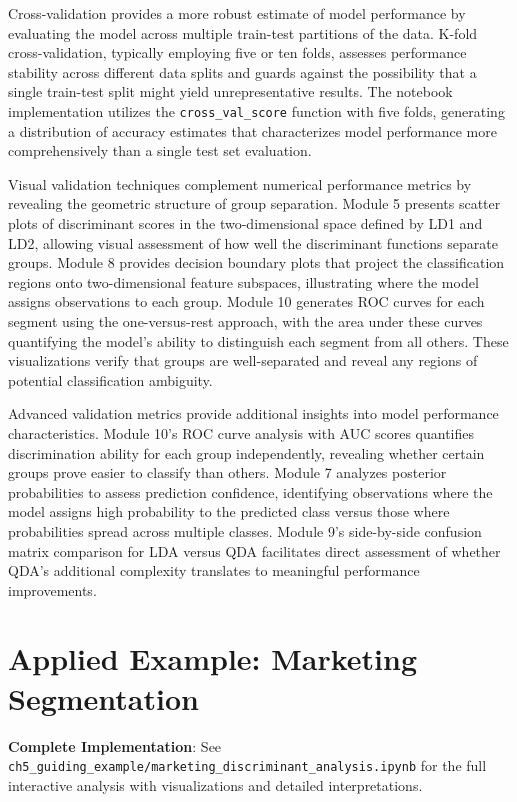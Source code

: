 \documentclass[
]{article}
\begin{document}
Cross-validation provides a more robust estimate of model performance by
evaluating the model across multiple train-test partitions of the data.
K-fold cross-validation, typically employing five or ten folds, assesses
performance stability across different data splits and guards against
the possibility that a single train-test split might yield
unrepresentative results. The notebook implementation utilizes the
\texttt{cross\_val\_score} function with five folds, generating a
distribution of accuracy estimates that characterizes model performance
more comprehensively than a single test set evaluation.

Visual validation techniques complement numerical performance metrics by
revealing the geometric structure of group separation. Module 5 presents
scatter plots of discriminant scores in the two-dimensional space
defined by LD1 and LD2, allowing visual assessment of how well the
discriminant functions separate groups. Module 8 provides decision
boundary plots that project the classification regions onto
two-dimensional feature subspaces, illustrating where the model assigns
observations to each group. Module 10 generates ROC curves for each
segment using the one-versus-rest approach, with the area under these
curves quantifying the model's ability to distinguish each segment from
all others. These visualizations verify that groups are well-separated
and reveal any regions of potential classification ambiguity.

Advanced validation metrics provide additional insights into model
performance characteristics. Module 10's ROC curve analysis with AUC
scores quantifies discrimination ability for each group independently,
revealing whether certain groups prove easier to classify than others.
Module 7 analyzes posterior probabilities to assess prediction
confidence, identifying observations where the model assigns high
probability to the predicted class versus those where probabilities
spread across multiple classes. Module 9's side-by-side confusion matrix
comparison for LDA versus QDA facilitates direct assessment of whether
QDA's additional complexity translates to meaningful performance
improvements.

\section{Applied Example: Marketing Segmentation}

\textbf{Complete Implementation}: See
\texttt{ch5\_guiding\_example/marketing\_discriminant\_analysis.ipynb}
for the full interactive analysis with visualizations and detailed
interpretations.
\end{document}
